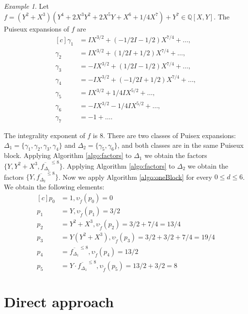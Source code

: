 \documentclass[a4paper,11pt]{amsart}%
\theoremstyle{definition}
\theoremstyle{plain}
\theoremstyle{remark}
\newtheorem{example}[defn]{Example}
\begin{document}
\begin{example}
\label{example:oneBlock}
Let $f = (Y^2+X^3)(Y^4 + 2X^3Y^2 + 2X^5Y + X^6 + 1/4X^7) + Y^7 \in{\mathbb{Q}}[X,Y]$.
The Puiseux expansions of $f$ are
\begin{equation*}
\begin{aligned}[c]
\gamma_{1} &=IX^{3/2} +(-1/2I-1/2)X^{7/4} + \dots,\\
\gamma_{2} &=IX^{3/2} +(1/2I+1/2)X^{7/4} + \dots,\\
\gamma_{3} &=-IX^{3/2}+(1/2I-1/2)X^{7/4} + \dots,\\
\gamma_{4} &=-IX^{3/2}+(-1/2I+1/2)X^{7/4} + \dots,\\
\gamma_{5} &=IX^{3/2}+ 1/4 I X^{5/2} + \dots,\\
\gamma_{6} &=-IX^{3/2} - 1/4 I X^{5/2} +  \dots,\\
\gamma_{7} &=-1 + \dots.
\end{aligned}
\end{equation*}

The integrality exponent of $f$ is 8. There are two classes of Puisex expansions: $\Delta_1 = \{\gamma_1, \gamma_2, \gamma_3, \gamma_4\}$ and $\Delta_2 = \{\gamma_5, \gamma_6\}$, and both classes are in the same Puiseux block. Applying Algorithm \ref{algo:factors} to $\Delta_1$ we obtain the factors $\{Y, Y^2 + X^3, \overline{f_{\Delta_1}}^{\le 8}\}$. Applying Algorithm \ref{algo:factors} to $\Delta_2$ we obtain the factors $\{Y, \overline{f_{\Delta_2}}^{\le 8}\}$. Now we apply Algorithm \ref{algo:oneBlock} for every $0 \le d \le 6$. We obtain the following elements:
$$
\begin{aligned}[c]
p_0 &= 1, \upsilon_{\tilde f}(p_0) = 0 \\
p_1 &= Y, \upsilon_{\tilde f}(p_1) = 3/2 \\
p_2 &= Y^2+X^3, \upsilon_{\tilde f}(p_2) = 3/2+7/4 = 13/4\\
p_3 &= Y(Y^2+X^3), \upsilon_{\tilde f}(p_3) = 3/2+3/2+7/4 = 19/4 \\
p_4 &= \overline{f_{\Delta_1}}^{\le 8}, \upsilon_{\tilde f}(p_4) = 13/2 \\
p_5 &= Y\cdot\overline{f_{\Delta_1}}^{\le 8}, \upsilon_{\tilde f}(p_5) = 13/2+3/2=8
\end{aligned}
$$
\end{example}

\section{Direct approach}
\label{section:directApproach}
\end{document}
